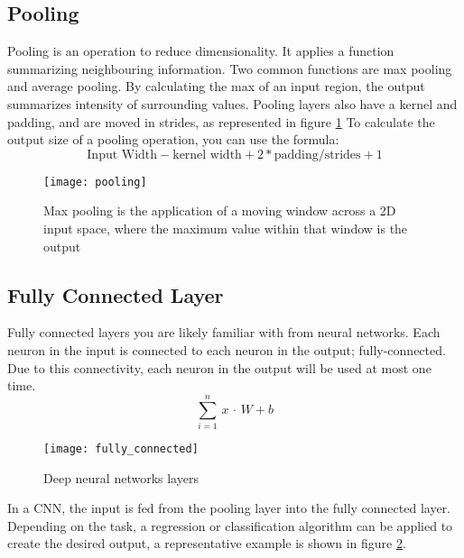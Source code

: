 \subsection{Pooling}
\label{ssec:pooling}
Pooling is an operation to reduce dimensionality. 
It applies a function summarizing neighbouring information.
Two common functions are max pooling and average pooling.
By calculating the max of an input region, the output summarizes intensity of
surrounding values.
Pooling layers also have a kernel and padding, and are moved in strides, as 
represented in figure \ref{fig:pooling}
To calculate the output size of a pooling operation, you can use the formula:
\begin{equation}
 \text{Input Width} - \text{kernel width} + 2 * \text{padding}  / \text{strides} + 1
\end{equation}
%
\begin{figure}[htb]
\centering
\texttt{[image: pooling]}
\caption{Max pooling is the application of a moving window across a 2D input 
space, where the maximum value within that window is the output}
\label{fig:pooling}
\end{figure}
%
\subsection{Fully Connected Layer}
\label{ssec:fully_connected}
Fully connected layers you are likely familiar with from neural networks.
Each neuron in the input is connected to each neuron in the output;
fully-connected.
Due to this connectivity, each neuron in the output will be used at most one
time.
%
\begin{equation}
  \sum_{i=1}^{n} \,  x \, \cdot \, W+b
\end{equation}
%
\begin{figure}[htb]
\centering
\texttt{[image: fully\_connected]}
\caption{Deep neural networks layers}
\label{fig:fully_connected}
\end{figure}
%
In a CNN, the input is fed from the pooling layer into the fully connected layer.
Depending on the task, a regression or classification algorithm can be applied
to create the desired output, a representative example is shown in figure \ref{fig:fully_connected}.
